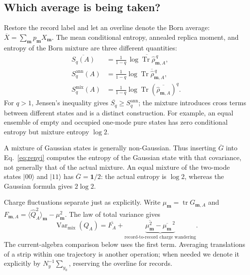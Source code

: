 \documentclass[aps,prb,onecolumn,nofootinbib,superscriptaddress]{revtex4-2}
\newcommand{\Id}{\mathbf{1}}
\newcommand{\Tr}{\operatorname{Tr}}
\newcommand{\tr}{\operatorname{tr}}
\newcommand{\Var}{\operatorname{Var}}
\newcommand{\ket}[1]{\lvert #1\rangle}
\begin{document}
\subsection{Which average is being taken?}
Restore the record label and let an overline denote the Born average:
$\overline{X}=\sum_{\boldsymbol m}p_{\boldsymbol m}X_{\boldsymbol m}$.
The mean conditional entropy, annealed replica moment, and entropy of
the Born mixture are three different quantities:
\begin{align}
 \overline{S_q(A)}
 &=\frac{1}{1-q}\,
   \overline{\log\Tr\hat\rho_{\boldsymbol m,A}^{\,q}},
 \label{eq:conditional-average}\\
 S_q^{\mathrm{ann}}(A)
 &=\frac{1}{1-q}\log
   \overline{\Tr\hat\rho_{\boldsymbol m,A}^{\,q}},\\
 S_q^{\mathrm{mix}}(A)
 &=\frac{1}{1-q}\log\Tr
   \left(\overline{\hat\rho_{\boldsymbol m,A}}\right)^q.
 \label{eq:mixture}
\end{align}
For $q>1$, Jensen's inequality gives
$\overline{S_q}\geq S_q^{\mathrm{ann}}$; the mixture introduces cross terms
between different states and is a distinct construction. For example, an
equal ensemble of empty and occupied one-mode pure states has zero
conditional entropy but mixture entropy $\log2$.

A mixture of Gaussian states is generally non-Gaussian. Thus inserting
$\overline G$ into Eq.~\eqref{eq:renyi} computes the entropy of the
Gaussian state with that covariance, not generally that of the actual
mixture. An equal mixture of the two-mode states $\ket{00}$ and
$\ket{11}$ has $\overline G=\Id/2$: the actual entropy is $\log2$,
whereas the Gaussian formula gives $2\log2$.

Charge fluctuations separate just as explicitly. Write
$\mu_{\boldsymbol m}=\tr G_{\boldsymbol m,A}$ and
$F_{\boldsymbol m,A}=\langle\hat Q_A^2\rangle_{\boldsymbol m}
-\mu_{\boldsymbol m}^2$. The law of total variance gives
\begin{equation}
 \Var_{\mathrm{mix}}(Q_A)
 =\overline{F_A}
   +\underbrace{\overline{\mu_{\boldsymbol m}^2}
                    -\overline{\mu_{\boldsymbol m}}^{\,2}}
               _{\text{record-to-record charge wandering}}.
 \label{eq:total-variance}
\end{equation}
The current-algebra comparison below uses the first term.
Averaging translations of a strip within one trajectory is another operation;
when needed we denote it explicitly by
$N_y^{-1}\sum_{y_0}$, reserving the overline for records.
\end{document}
